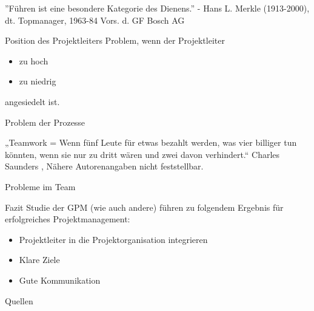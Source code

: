 \documentclass[12pt]{beamer}
\begin{document}
	\thispagestyle{empty}
	\begin{frame}
		''Führen ist eine besondere Kategorie des Dienens.'' - Hans L. Merkle (1913-2000), dt. Topmanager, 1963-84 Vors. d. GF Bosch AG
	\end{frame}


	\begin{frame}{Position des Projektleiters}
		Problem, wenn der Projektleiter
		\begin{itemize}
			\item{zu hoch}
			\item{zu niedrig} 
		\end{itemize}
		angesiedelt ist.
		
	\end{frame}

	\thispagestyle{empty}
	\begin{frame}
		
	\end{frame}

	
	\begin{frame}{Problem der Prozesse}
					
	\end{frame}
	
	\thispagestyle{empty}
	\begin{frame}
		„Teamwork = Wenn fünf Leute für etwas bezahlt werden, was vier billiger tun könnten, wenn sie nur zu dritt wären und zwei davon verhindert.“
Charles Saunders , Nähere Autorenangaben nicht feststellbar.
	\end{frame}

	
	\begin{frame}{Probleme im Team}
		
	\end{frame}

	\begin{frame}{Fazit}
		Studie der GPM (wie auch andere) führen zu folgendem Ergebnis für erfolgreiches Projektmanagement:
		\begin{itemize}
			\item{Projektleiter in die Projektorganisation integrieren}
			\item{Klare Ziele}
			\item{Gute Kommunikation}
		\end{itemize}

	\end{frame}
	
	\begin{frame}{Quellen}
		
	\end{frame}
\end{document}
